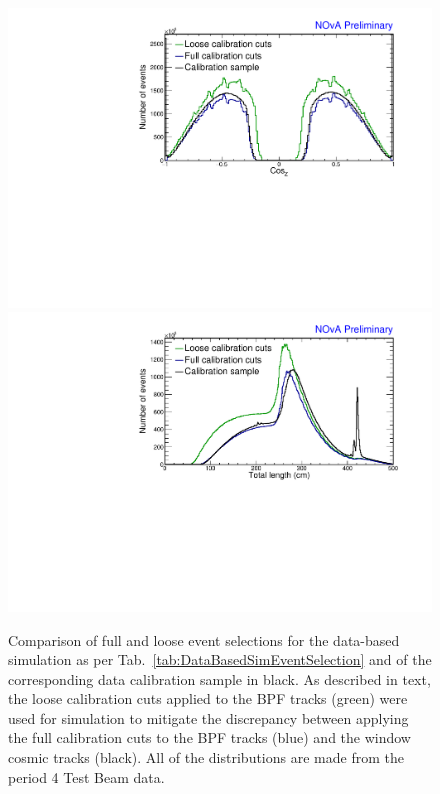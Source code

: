 \begin{figure}[!h]
\includegraphics[clip, width=\textwidth]{Plots/TBCalibration/DBSim_SelectionComparisonPCHitsListCut_CosZ.pdf}
\includegraphics[clip, width=\textwidth]{Plots/TBCalibration/DBSim_SelectionComparisonPCHitsListCut_TotLength.pdf}
\caption[Event selection for the data-based simulation]{Comparison of full and loose event selections for the data-based simulation as per Tab.~\ref{tab:DataBasedSimEventSelection} and of the corresponding data calibration sample in black. As described in text, the loose calibration cuts applied to the \acrshort{BPF} tracks (green) were used for simulation to mitigate the discrepancy between applying the full calibration cuts to the \acrshort{BPF} tracks (blue) and the window cosmic tracks (black). All of the distributions are made from the period 4 Test Beam data.}
\label{fig:DataBasedSimCalibCutsComparison}
\end{figure}

